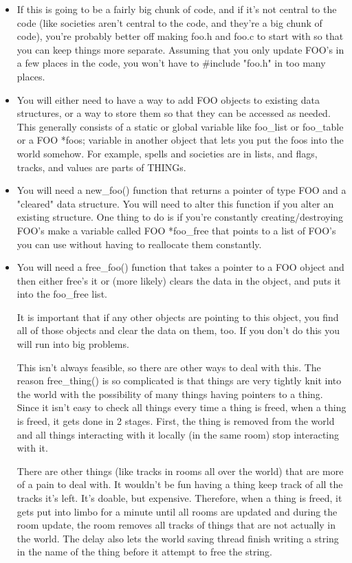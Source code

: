 \begin{itemize}

\item If this is going to be a fairly big chunk of code, and if it's
not central to the code (like societies aren't central to the
code, and they're a big chunk of code), you're probably better
off making foo.h and foo.c to start with so that you can keep
things more separate. Assuming that you only update FOO's in a 
few places in the code, you won't have to \#include "foo.h"
in too many places.

\item You will either need to have a way to add FOO objects to
existing data structures, or a way to store them so that
they can be accessed as needed. This generally consists of a
static or global variable like foo\_list or foo\_table or a
FOO *foos; variable in another object that lets you put the
foos into the world somehow. For example, spells and 
societies are in lists, and flags, tracks, and values are
parts of THINGs.

\item You will need a new\_foo() function that returns a pointer
of type FOO and a "cleared" data structure. You will need to alter
this function if you alter an existing structure. One thing to do
is if you're constantly creating/destroying FOO's make a variable
called FOO *foo\_free that points to a list of FOO's you can use
without having to reallocate them constantly.

\item You will need a free\_foo() function that takes a pointer
to a FOO object and then either free's it or (more likely) clears
the data in the object, and puts it into the foo\_free list.

It is important that if any other objects are pointing to this
object, you find all of those objects and clear the data on
them, too. If you don't do this you will run into big problems.

This isn't always feasible, so there are other ways to deal with
this. The reason free\_thing() is so complicated is that things
are very tightly knit into the world with the possibility of
many things having pointers to a thing. Since it isn't easy to
check all things every time a thing is freed, when a thing
is freed, it gets done in 2 stages. First, the thing is removed
from the world and all things interacting with it locally (in
the same room) stop interacting with it.

There are other things (like tracks in rooms all over the world)
that are more of a pain to deal with. It wouldn't be fun having
a thing keep track of all the tracks it's left. It's doable,
but expensive. Therefore, when a thing is freed, it gets put
into limbo for a minute until all rooms are updated and during
the room update, the room removes all tracks of things that are
not actually in the world. The delay also lets the world saving
thread finish writing a string in the name of the thing 
before it attempt to free the string. 


\end{itemize}
